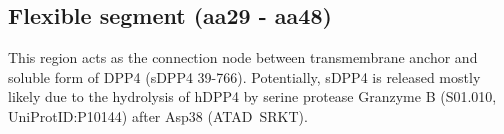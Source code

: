\subsection{Flexible segment (aa29 - aa48)}

This region acts as the connection node between transmembrane anchor and soluble form of DPP4 (sDPP4 39-766). Potentially, sDPP4 is released mostly likely due to the hydrolysis of hDPP4 by serine protease Granzyme B (S01.010, UniProtID:P10144) after Asp38 (ATAD~\textbar SRKT).~\cite{Song_2018} 
